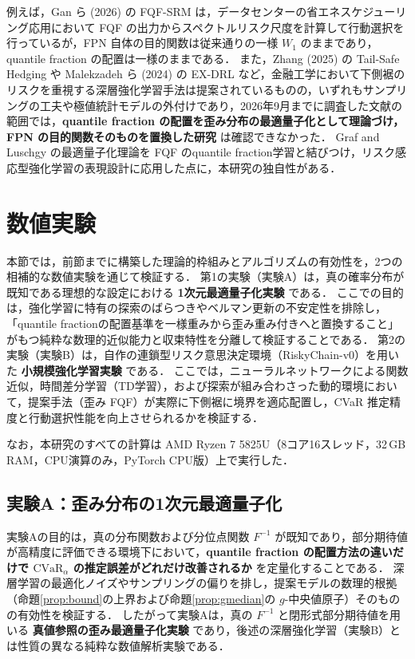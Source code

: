 \documentclass[a4paper,10pt]{jsarticle}
\theoremstyle{definition}
\newcommand{\CVaR}{\mathrm{CVaR}}
\renewcommand{\Finv}{F^{-1}}
\begin{document}
例えば，Gan ら (2026) \cite{gan2026energy} の FQF-SRM は，データセンターの省エネスケジューリング応用において FQF の出力からスペクトルリスク尺度を計算して行動選択を行っているが，FPN 自体の目的関数は従来通りの一様 $W_1$ のままであり，quantile fraction の配置は一様のままである．
また，Zhang (2025) \cite{zhang2025tailsafe} の Tail-Safe Hedging や Malekzadeh ら (2024) \cite{malekzadeh2024exdrl} の EX-DRL など，金融工学において下側裾のリスクを重視する深層強化学習手法は提案されているものの，いずれもサンプリングの工夫や極値統計モデルの外付けであり，2026年9月までに調査した文献の範囲では，\textbf{quantile fraction の配置を歪み分布の最適量子化として理論づけ，FPN の目的関数そのものを置換した研究} は確認できなかった．
Graf and Luschgy \cite{graf2000quantization} の最適量子化理論を FQF のquantile fraction学習と結びつけ，リスク感応型強化学習の表現設計に応用した点に，本研究の独自性がある．
\section{数値実験}
\label{sec:exp}
本節では，前節までに構築した理論的枠組みとアルゴリズムの有効性を，2つの相補的な数値実験を通じて検証する．
第1の実験（実験A）は，真の確率分布が既知である理想的な設定における \textbf{1次元最適量子化実験} である．
ここでの目的は，強化学習に特有の探索のばらつきやベルマン更新の不安定性を排除し，「quantile fractionの配置基準を一様重みから歪み重み付きへと置換すること」がもつ純粋な数理的近似能力と収束特性を分離して検証することである．
第2の実験（実験B）は，自作の連鎖型リスク意思決定環境（RiskyChain-v0）を用いた \textbf{小規模強化学習実験} である．
ここでは，ニューラルネットワークによる関数近似，時間差分学習（TD学習），および探索が組み合わさった動的環境において，提案手法（歪み FQF）が実際に下側裾に境界を適応配置し，CVaR 推定精度と行動選択性能を向上させられるかを検証する．

なお，本研究のすべての計算は AMD Ryzen 7 5825U（8コア16スレッド，32\,GB RAM，CPU演算のみ，PyTorch CPU版）上で実行した．

\subsection{実験A：歪み分布の1次元最適量子化}
\label{subsec:expA}
実験Aの目的は，真の分布関数および分位点関数 $\Finv$ が既知であり，部分期待値が高精度に評価できる環境下において，\textbf{quantile fraction の配置方法の違いだけで $\CVaR_\alpha$ の推定誤差がどれだけ改善されるか} を定量化することである．
深層学習の最適化ノイズやサンプリングの偏りを排し，提案モデルの数理的根拠（命題\ref{prop:bound}の上界および命題\ref{prop:gmedian}の $g$-中央値原子）そのものの有効性を検証する．
したがって実験Aは，真の $\Finv$ と閉形式部分期待値を用いる \textbf{真値参照の歪み最適量子化実験} であり，後述の深層強化学習（実験B）とは性質の異なる純粋な数値解析実験である．
\end{document}

